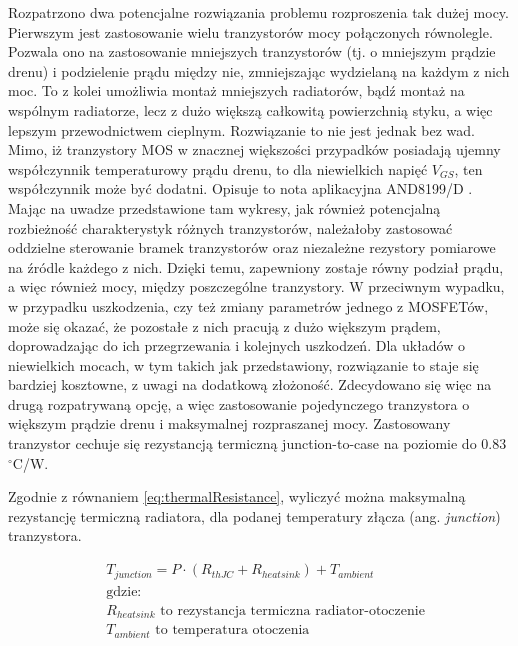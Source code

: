 Rozpatrzono dwa potencjalne rozwiązania problemu rozproszenia tak dużej mocy. Pierwszym jest zastosowanie wielu 
tranzystorów mocy połączonych równolegle. Pozwala ono na zastosowanie mniejszych tranzystorów (tj. o mniejszym prądzie drenu)
i podzielenie prądu między nie, zmniejszając wydzielaną na każdym z nich moc. To z kolei umożliwia montaż mniejszych radiatorów,
bądź montaż na wspólnym radiatorze, lecz z dużo większą całkowitą powierzchnią styku, a więc lepszym przewodnictwem cieplnym.
Rozwiązanie to nie jest jednak bez wad. Mimo, iż tranzystory MOS w znacznej większości przypadków posiadają ujemny współczynnik temperaturowy
prądu drenu, to dla niewielkich napięć $V_{GS}$, ten współczynnik może być dodatni. Opisuje to nota aplikacyjna AND8199/D \cite{parallelMOS}.
Mając na uwadze przedstawione tam wykresy, jak również potencjalną rozbieżność charakterystyk różnych tranzystorów,
należałoby zastosować oddzielne sterowanie bramek tranzystorów oraz niezależne rezystory pomiarowe na źródle każdego z nich.
Dzięki temu, zapewniony zostaje równy podział prądu, a więc również mocy, między poszczególne tranzystory. W przeciwnym wypadku, w przypadku 
uszkodzenia, czy też zmiany parametrów jednego z MOSFETów, może się okazać, że pozostałe z nich pracują z dużo większym prądem, doprowadzając do ich 
przegrzewania i kolejnych uszkodzeń.
Dla układów o niewielkich mocach, w tym takich jak przedstawiony, rozwiązanie to staje się bardziej kosztowne, z uwagi na 
dodatkową złożoność.
Zdecydowano się więc na drugą rozpatrywaną opcję, a więc zastosowanie pojedynczego tranzystora o większym prądzie drenu i 
maksymalnej rozpraszanej mocy. Zastosowany tranzystor cechuje się rezystancją termiczną junction-to-case 
na poziomie do 0.83 $^{\circ}$C/W.

Zgodnie z równaniem \ref{eq:thermalResistance}, wyliczyć można maksymalną rezystancję termiczną radiatora, dla 
podanej temperatury złącza (ang. \textit{junction}) tranzystora.

\begin{equation}
    \label{eq:thermalResistance}
    \begin{aligned}
        &T_{junction} = P \cdot (R_{thJC} + R_{heatsink}) + T_{ambient} \\
        &\text{gdzie:} \\
        &\text{$R_{heatsink}$ to rezystancja termiczna radiator-otoczenie} \\
        &\text{$T_{ambient}$ to temperatura otoczenia}
    \end{aligned}
\end{equation}

